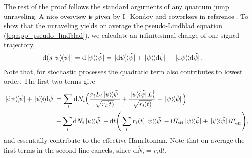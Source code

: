 \documentclass[twocolumn,prl,superscriptaddress]{revtex4-2}
\renewcommand{\i}{\mathrm i}
\begin{document}
The rest of the proof follows the standard arguments of any quantum jump unraveling. A nice overview is given by I.\ Kondov and coworkers in reference \cite{IKondovMschreiber2003}. To show that the unraveling yields on average the pseudo-Lindblad equation (\ref{eq:app_pseudo_lindblad}), we calculate an infinitesimal change of one signed trajectory,
\begin{align}
	\mathrm d (s \dyad{\psi}) &= \mathrm d \dyad*{\psi}{\tilde\psi} = \dyad*{\mathrm d \psi}{\tilde\psi} + \dyad*{\psi}{\mathrm d \tilde \psi} + \dyad*{\mathrm d \psi}{\mathrm d \tilde \psi}.
\end{align}
Note that, for stochastic processes the quadratic term also contributes to lowest order. The first two terms give
\begin{align}
	\begin{split}
		\dyad*{\mathrm d \psi}{\tilde\psi} + \dyad*{\psi}{\mathrm d \tilde \psi} &= \sum_i \mathrm dN_i \Big(\frac{\sigma_i L_i \dyad*{ \psi}{\tilde\psi} }{\sqrt{ r_i(t)}} + \frac{\dyad*{ \psi}{\tilde\psi} L_i^\dagger  }{\sqrt{ r_i(t)}} - \dyad*{ \psi}{\tilde\psi} \Big) \\ & - \sum_i \mathrm dN_i \dyad*{ \psi}{\tilde\psi}+ \mathrm dt \Bigg(\sum_i  r_i(t) \dyad*{ \psi}{\tilde\psi} - \i H_\mathrm{eff} \dyad*{ \psi}{\tilde\psi} + \dyad*{ \psi}{\tilde\psi}\i H_\mathrm{eff}^\dagger \Bigg) ,
	\end{split}
	\label{eq:app_hermitianterms}
\end{align}
and essentially contribute to the effective Hamiltonian. Note that on average the first terms in the second line cancels, since $\overline{\mathrm d N_i} = r_i\mathrm d t$.
\end{document}
